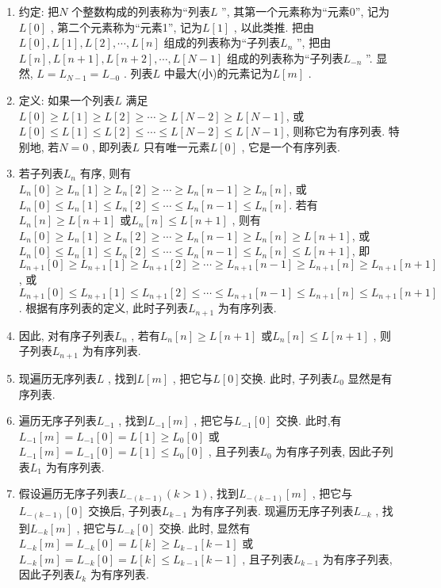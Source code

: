 \documentclass[12pt,a4paper]{ctexart}
\author{Hifumi Shiroan}
\begin{document}
    \begin{enumerate}
        \item 约定: 把$ N $ 个整数构成的列表称为``列表$ L $ '', 其第一个元素称为``元素0'', 记为$ L[0] $ , 第二个元素称为``元素1'', 记为$ L[1] $ , 以此类推. 把由$ L[0], L[1], L[2], \cdots, L[n] $ 组成的列表称为``子列表$ L_n $ '', 把由$ L[n], L[n+1], L[n+2], \cdots, L[N-1] $ 组成的列表称为``子列表$ L_{-n} $ ''. 显然, $ L=L_{N-1}=L_{-0} $ . 列表$ L $ 中最大(小)的元素记为$ L[m] $ .
        \item 定义: 如果一个列表$ L $ 满足$ L[0]\ge L[1]\ge L[2]\ge\cdots\ge L[N-2]\ge L[N-1] $, 或 $ L[0]\le L[1]\le L[2]\le\cdots\le L[N-2]\le L[N-1] $, 则称它为有序列表. 特别地, 若$ N=0 $ , 即列表$ L $ 只有唯一元素$ L[0] $ , 它是一个有序列表.
        \item 若子列表$ L_n $ 有序, 则有$ L_n[0]\ge L_n[1]\ge L_n[2]\ge\cdots\ge L_n[n-1]\ge L_n[n] $, 或 $ L_n[0]\le L_n[1]\le L_n[2]\le\cdots\le L_n[n-1]\le L_n[n] $. 若有$ L_n[n]\ge L[n+1] $ 或$ L_n[n]\le L[n+1] $ , 则有$ L_n[0]\ge L_n[1]\ge L_n[2]\ge\cdots\ge L_n[n-1]\ge L_n[n]\ge L[n+1] $, 或 $ L_n[0]\le L_n[1]\le L_n[2]\le\cdots\le L_n[n-1]\le L_n[n]\le L[n+1] $, 即$ L_{n+1}[0]\ge L_{n+1}[1]\ge L_{n+1}[2]\ge\cdots\ge L_{n+1}[n-1]\ge L_{n+1}[n]\ge L_{n+1}[n+1] $, 或 $ L_{n+1}[0]\le L_{n+1}[1]\le L_{n+1}[2]\le\cdots\le L_{n+1}[n-1]\le L_{n+1}[n]\le L_{n+1}[n+1] $. 根据有序列表的定义, 此时子列表$ L_{n+1} $ 为有序列表.
        \item 因此, 对有序子列表$ L_n $ , 若有$ L_n[n]\ge L[n+1] $ 或$ L_n[n]\le L[n+1] $ , 则子列表$ L_{n+1} $ 为有序列表.
        \item 现遍历无序列表$ L $ , 找到$ L[m] $ , 把它与$ L[0] $交换. 此时, 子列表$ L_0 $ 显然是有序列表.
        \item 遍历无序子列表$ L_{-1} $ , 找到$ L_{-1}[m] $ , 把它与$ L_{-1}[0] $ 交换. 此时,有 $ L_{-1}[m]=L_{-1}[0]=L[1]\ge L_0[0] $ 或 $ L_{-1}[m]=L_{-1}[0]=L[1]\le L_0[0] $ , 且子列表$ L_0 $ 为有序子列表, 因此子列表$ L_1 $ 为有序列表.
        \item 假设遍历无序子列表$ L_{-(k-1)}(k>1) $, 找到$ L_{-(k-1)}[m] $ , 把它与$ L_{-(k-1)}[0] $ 交换后, 子列表$ L_{k-1} $ 为有序子列表. 现遍历无序子列表$ L_{-k} $ , 找到$ L_{-k}[m] $ , 把它与$ L_{-k}[0] $ 交换. 此时, 显然有 $ L_{-k}[m]=L_{-k}[0]=L[k]\ge L_{k-1}[k-1] $ 或 $ L_{-k}[m]=L_{-k}[0]=L[k]\le L_{k-1}[k-1] $ , 且子列表$ L_{k-1} $ 为有序子列表, 因此子列表$ L_k $ 为有序列表.

\end{enumerate}
\end{document}

